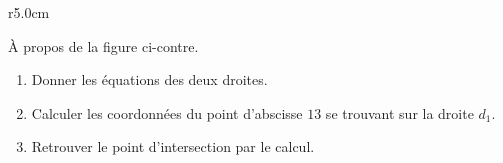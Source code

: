 
\begin{exercice}\label{exosmath-0413}

\begin{wrapfigure}{r}{5.0cm}
    \vspace{-1cm}
    \centering
    
\end{wrapfigure}

        À propos de la figure ci-contre.
        \begin{enumerate}
            \item
                Donner les équations des deux droites.
            \item
                Calculer les coordonnées du point d'abscisse \( 13\) se trouvant sur la droite \( d_1\).
            \item
                Retrouver le point d'intersection par le calcul. 
        \end{enumerate}

\end{exercice}
